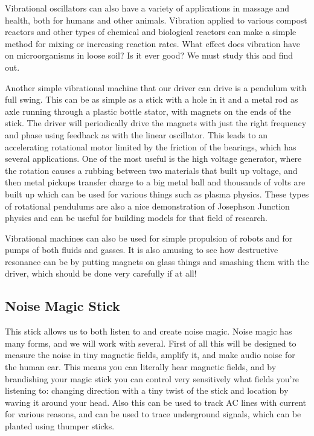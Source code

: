 Vibrational oscillators can also have a variety of applications in
massage and health, both for humans and other animals. Vibration applied
to various compost reactors and other types of chemical and biological
reactors can make a simple method for mixing or increasing reaction
rates. What effect does vibration have on microorganisms in loose soil?
Is it ever good? We must study this and find out.

Another simple vibrational machine that our driver can drive is a
pendulum with full swing. This can be as simple as a stick with a hole
in it and a metal rod as axle running through a plastic bottle stator,
with magnets on the ends of the stick. The driver will periodically
drive the magnets with just the right frequency and phase using feedback
as with the linear oscillator. This leads to an accelerating rotational
motor limited by the friction of the bearings, which has several
applications. One of the most useful is the high voltage generator,
where the rotation causes a rubbing between two materials that built up
voltage, and then metal pickups transfer charge to a big metal ball and
thousands of volts are built up which can be used for various things
such as plasma physics. These types of rotational pendulums are also a
nice demonstration of Josephson Junction physics and can be useful for
building models for that field of research.

Vibrational machines can also be used for simple propulsion of robots
and for pumps of both fluids and gasses. It is also amusing to see how
destructive resonance can be by putting magnets on glass things and
smashing them with the driver, which should be done very carefully if at
all!

\subsection{Noise Magic Stick}\label{noise-magic-stick}

This stick allows us to both listen to and create noise magic. Noise
magic has many forms, and we will work with several. First of all this
will be designed to measure the noise in tiny magnetic fields, amplify
it, and make audio noise for the human ear. This means you can literally
hear magnetic fields, and by brandishing your magic stick you can
control very sensitively what fields you're listening to: changing
direction with a tiny twist of the stick and location by waving it
around your head. Also this can be used to track AC lines with current
for various reasons, and can be used to trace underground signals, which
can be planted using thumper sticks.

